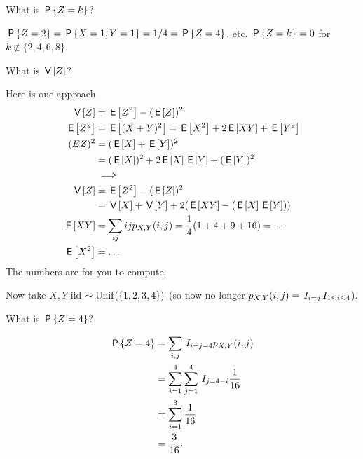 \documentclass[lectures-questions]{subfiles}
\begin{document}
\begin{exercise}
What is $\P{Z=k}$?
\begin{solution}
$\P{Z=2} = \P{X=1, Y=1} = 1/4 = \P{Z=4}$, etc.
$\P{Z=k} = 0$ for $k\not \in \{2, 4, 6, 8\}$.
\end{solution}
\end{exercise}


\begin{exercise}
What is $\V Z$?
\begin{solution}
Here is one approach
\begin{align}
\label{eq:83}
\V Z &= \E{Z^2} - (\E Z)^{2}\\
\E{Z^2} &= \E{(X+Y)^{2}} = \E{X^{2}} + 2\E{XY} + \E{Y^{2}} \\
(E{Z})^{2} &= (\E X + \E Y)^{2} \\
 &= (\E X)^2 + 2\E X \E Y + (\E Y)^{2} \\
&\implies \\
\V Z &= \E{Z^2} - (\E Z)^{2}\\
 &= \V X + \V Y + 2 (\E{XY} - (\E X \E Y))\\
\E{XY} &= \sum_{ij} ijp_{X,Y}(i,j) = \frac 1 4 (1 + 4 + 9 + 16) = \ldots \\
\E{X^{2}} &= \ldots
\end{align}
The numbers are for you to compute.
\end{solution}
\end{exercise}

Now take $X, Y$ iid $\sim\Unif{\{1,2,3,4\}}$ (so now no longer $p_{X,Y}(i,j) = \1{i=j}\1{1\leq i \leq 4}$).

\begin{exercise}
What is $\P{Z=4}$?
\begin{solution}
\begin{align}
\label{eq:82}
\P{Z=4}
&= \sum_{i, j} \1{i+j=4} p_{X,Y}(i,j) \\
&= \sum_{i=1}^4 \sum_{j=1}^{4} \1{j=4-i} \frac{1}{16} \\
&= \sum_{i=1}^3  \frac{1}{16} \\
&= \frac{3}{16}.
\end{align}
\end{solution}
\end{exercise}
\end{document}
